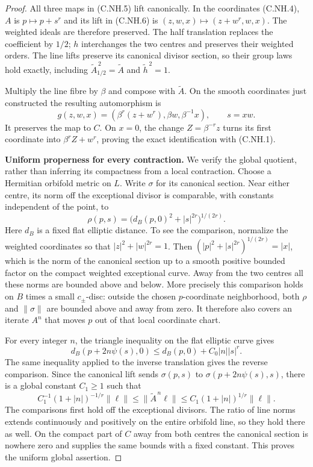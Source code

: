 \begin{proof}
All three maps in (C.NH.5) lift canonically. In the
coordinates (C.NH.4), $A$ is $p\mapsto p+s^r$ and its lift
in (C.NH.6) is $(z,w,x)\mapsto(z+w^r,w,x)$.
The weighted ideals are therefore preserved. The half
translation replaces the coefficient by $1/2$; $h$
interchanges the two centres and preserves their weighted
orders. The line lifts preserve its canonical divisor
section, so their group laws hold exactly, including
$\widetilde A_{1/2}^{\,2}=\widetilde A$ and
$\widetilde h^{\,2}=1$.

Multiply the line fibre by $\beta$ and compose with
$\widetilde A$. On the smooth coordinates just constructed
the resulting automorphism is
\[
 g(z,w,x)=
       (\beta^r(z+w^r),\beta w,\beta^{-1}x),
 \qquad s=xw.
                                                        \tag{C.NH.8}
\]
It preserves the map to $C$. On $x=0$, the change
$Z=\beta^{-r}z$ turns its first coordinate into
$\beta^r Z+w^r$, proving the exact identification with
(C.NH.1).

\par\medskip\noindent\textbf{Uniform properness for every contraction.}
We verify the global quotient, rather than inferring its
compactness from a local contraction. Choose a Hermitian
orbifold metric on $L$. Write $\sigma$ for its canonical
section. Near either centre, its norm off the exceptional
divisor is comparable, with constants independent of the
point, to
\[
       \rho(p,s)=\bigl(d_B(p,0)^2+|s|^{2r}\bigr)^{1/(2r)}.
                                                        \tag{C.NH.9}
\]
Here $d_B$ is a fixed flat elliptic distance. To see the
comparison, normalize the weighted coordinates so that
$|z|^2+|w|^{2r}=1$. Then
$(|p|^2+|s|^{2r})^{1/(2r)}=|x|$, which is the norm of the
canonical section up to a smooth positive bounded factor
on the compact weighted exceptional curve. Away from the
two centres all these norms are bounded above and below.
More precisely this comparison holds on $B$ times a small
$c_\pm$-disc: outside the chosen $p$-coordinate neighborhood,
both $\rho$ and $\|\sigma\|$ are bounded above and away from
zero. It therefore also covers an iterate $A^n$ that moves
$p$ out of that local coordinate chart.

For every integer $n$, the triangle inequality on the flat
elliptic curve gives
\[
 d_B(p+2n\psi(s),0)
       \le d_B(p,0)+C_0|n||s|^r.
\]
The same inequality applied to the inverse translation
gives the reverse comparison. Since the canonical lift
sends $\sigma(p,s)$ to $\sigma(p+2n\psi(s),s)$, there is
a global constant $C_1\ge1$ such that
\[
 C_1^{-1}(1+|n|)^{-1/r}\|\ell\|
 \le \|\widetilde A^{\,n}\ell\|
 \le C_1(1+|n|)^{1/r}\|\ell\|.
                                                        \tag{C.NH.10}
\]
The comparisons first hold off the exceptional divisors.
The ratio of line norms extends continuously and positively
on the entire orbifold line, so they hold there as well.
On the compact part of $C$ away from both centres the
canonical section is nowhere zero and supplies the same
bounds with a fixed constant. This proves the uniform
global assertion.


\end{proof}
